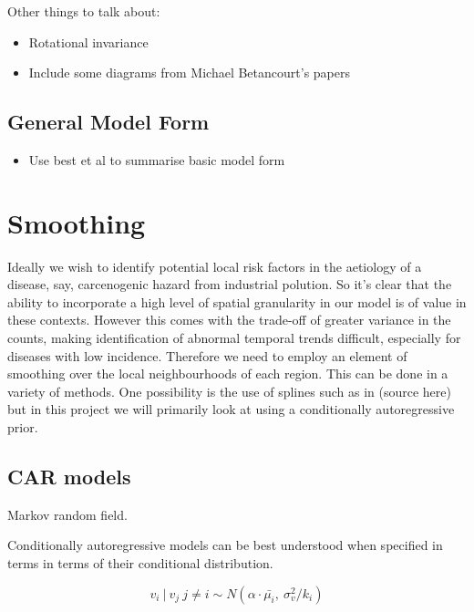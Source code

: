 \documentclass{article}
\begin{document}
Other things to talk about:
\begin{itemize}

\item Rotational invariance

\item Include some diagrams from Michael Betancourt's papers

\end{itemize}

\subsection{General Model Form}

\begin{itemize}
\item Use best et al to summarise basic model form
\end{itemize}

\section{Smoothing}

Ideally we wish to identify potential local risk factors in the aetiology of a disease, say, carcenogenic hazard from industrial polution. So it's clear that the ability to incorporate a high level of spatial granularity in our model is of value in these contexts. However this comes with the trade-off of greater variance in the counts, making identification of abnormal temporal trends difficult, especially for diseases with low incidence. Therefore we need to employ an element of smoothing over the local neighbourhoods of each region. This can be done in a variety of methods. One possibility is the use of splines such as in (source here) but in this project we will primarily look at using a conditionally autoregressive prior.

\subsection{CAR models}

Markov random field.

Conditionally autoregressive models can be best understood when specified in terms in terms of their conditional distribution. 

\begin{equation}
v_i \ | \ v_j \ j \neq i \sim N(\alpha \cdot \bar{\mu_i}, \ \sigma_v^2/k_i)
\end{equation}
\end{document}

